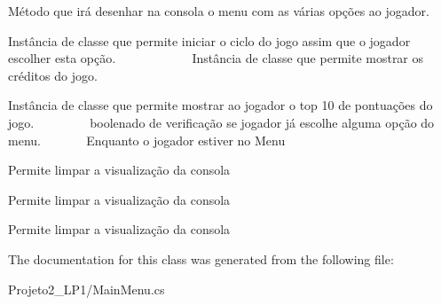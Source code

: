 Método que irá desenhar na consola o menu com as várias opções ao jogador. 

Instância de classe que permite iniciar o ciclo do jogo assim que o jogador escolher esta opção. ~\newline
~\newline
~\newline
~\newline
~\newline
~\newline
~\newline
 Instância de classe que permite mostrar os créditos do jogo.

Instância de classe que permite mostrar ao jogador o top 10 de pontuações do jogo. ~\newline
~\newline
~\newline
~\newline
~\newline
 boolenado de verificação se jogador já escolhe alguma opção do menu. ~\newline
~\newline
~\newline
~\newline
 Enquanto o jogador estiver no Menu

Permite limpar a visualização da consola

Permite limpar a visualização da consola

Permite limpar a visualização da consola 

The documentation for this class was generated from the following file\+:\begin{DoxyCompactItemize}
\item 
Projeto2\+\_\+\+L\+P1/Main\+Menu.\+cs\end{DoxyCompactItemize}
